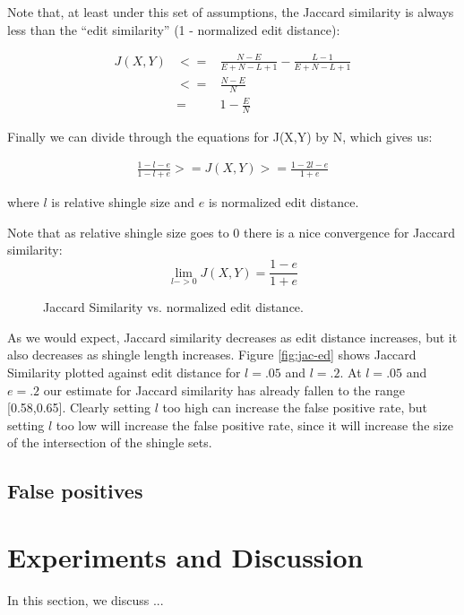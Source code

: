 \documentclass{acm_proc_article-sp}
\begin{document}
Note that, at least under this set of assumptions, the Jaccard similarity is always less than the ``edit similarity'' (1 - normalized edit distance):

\begin{eqnarray*}
J(X,Y) & <= & \frac{N - E}{E + N - L + 1} - \frac{L - 1}{E + N - L + 1} \\
       & <= & \frac{N - E}{N} \\ 
       & =  & 1 - \frac{E}{N}
\end{eqnarray*}

Finally we can divide through the equations for J(X,Y) by N, which gives us:

\begin{eqnarray*}
\frac{1 - l - e}{1 - l + e} >= J(X,Y) >= \frac{1 - 2l - e}{1 + e}
\end{eqnarray*}

where $l$ is relative shingle size and $e$ is normalized edit distance.

Note that as relative shingle size goes to 0 there is a nice convergence for Jaccard similarity:
\[\lim_{l->0}J(X,Y) = \frac{1 - e}{1 + e}\]

\begin{figure*}
\centering
{}
\caption{Jaccard Similarity vs. normalized edit distance.}
\label{jac-ed}
\end{figure*}

As we would expect, Jaccard similarity decreases as edit distance increases, but it also decreases as shingle length increases. Figure \ref{fig:jac-ed} shows Jaccard Similarity plotted against edit distance for $l = .05$ and $l = .2$. At $l = .05$ and $e = .2$ our estimate for Jaccard similarity has already fallen to the range [0.58,0.65]. Clearly setting $l$ too high can increase the false positive rate, but setting $l$ too low will increase the false positive rate, since it will increase the size of the intersection of the shingle sets.

\subsection{False positives}

\begin{figure*}
\centering
{}
\caption{}
\label{ed-grid}
\end{figure*}


\section{Experiments and Discussion}
In this section, we discuss ...
\end{document}
